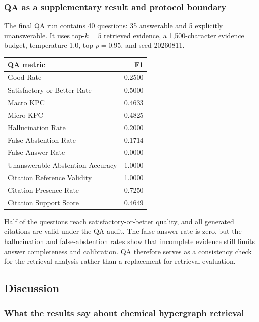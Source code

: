 \subsubsection{QA as a supplementary result and protocol boundary}

The final QA run contains 40 questions: 35 answerable and 5 explicitly unanswerable. It uses top-$k=5$ retrieved evidence, a 1,500-character evidence budget, temperature 1.0, top-$p=0.95$, and seed 20260811.

\begin{table}[t]
\centering
\small
\begin{tabularx}{\linewidth}{Xr}
\toprule
QA metric & F1 \\
\midrule
Good Rate & 0.2500 \\
Satisfactory-or-Better Rate & 0.5000 \\
Macro KPC & 0.4633 \\
Micro KPC & 0.4825 \\
Hallucination Rate & 0.2000 \\
False Abstention Rate & 0.1714 \\
False Answer Rate & 0.0000 \\
Unanswerable Abstention Accuracy & 1.0000 \\
Citation Reference Validity & 1.0000 \\
Citation Presence Rate & 0.7250 \\
Citation Support Score & 0.4649 \\
\bottomrule
\end{tabularx}
\end{table}

Half of the questions reach satisfactory-or-better quality, and all generated citations are valid under the QA audit. The false-answer rate is zero, but the hallucination and false-abstention rates show that incomplete evidence still limits answer completeness and calibration. QA therefore serves as a consistency check for the retrieval analysis rather than a replacement for retrieval evaluation.

\subsection{Discussion}

\subsubsection{What the results say about chemical hypergraph retrieval}

